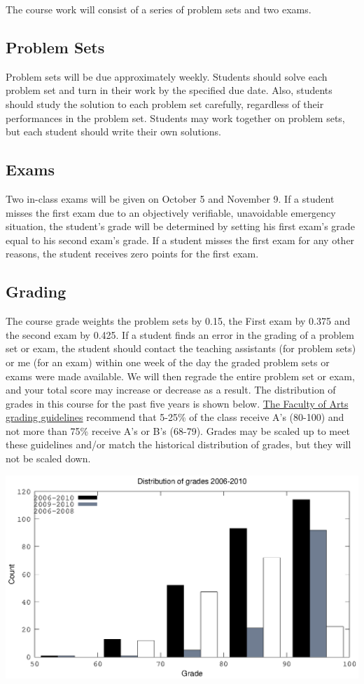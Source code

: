 \documentclass[10pt]{article}
\begin{document}
The course work will consist of a series of problem sets and two
exams. 

\subsection{Problem Sets}
Problem sets will be due approximately weekly.  Students should solve
each problem set and turn in their work by the specified due
date. Also, students should study the solution to each problem set
carefully, regardless of their performances in the problem
set. Students may work together on problem sets, but each student
should write their own solutions.

\subsection{Exams}
Two in-class exams will be given on October 5 and November 9. If a
student misses the first exam due to an objectively verifiable,
unavoidable emergency situation, the student's grade will be
determined by setting his first exam's grade equal to his second
exam's grade. If a student misses the first exam for any other
reasons, the student receives zero points for the first exam. 

\subsection{Grading}
The course grade weights the problem sets by 0.15, the First exam by
0.375 and the second exam by 0.425. If a student finds an error in the
grading of a problem set or exam, the student should contact the
teaching assistants (for problem sets) or me (for an exam) within one
week of the day the graded problem sets or exams were made
available. We will then regrade the entire problem set or exam, and
your total score may increase or decrease as a result.  The
distribution of grades in this course for the past five years is shown
below.
\href{http://www.arts.ubc.ca/faculty-amp-staff/resources/courses-and-grading/grading-guidelines.html}
{The Faculty of Arts grading guidelines} recommend that 5-25\% of the
class receive A's (80-100) and not more than 75\% receive A's or B's
(68-79). Grades may be scaled up to meet these guidelines and/or match
the historical distribution of grades, but they will not be scaled
down. 

\begin{centering}
  \includegraphics[width=0.8\linewidth]{526gradeDist}
\end{centering}
\end{document}
